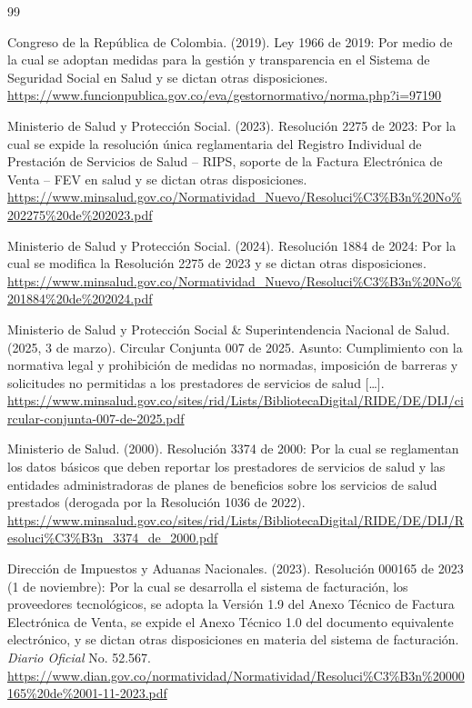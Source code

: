 \documentclass[12pt,letterpaper]{report}
\begin{document}
\begin{thebibliography}{99}


Congreso de la República de Colombia. (2019). Ley 1966 de 2019: Por medio de la cual se adoptan medidas para la gestión y transparencia en el Sistema de Seguridad Social en Salud y se dictan otras disposiciones. \url{https://www.funcionpublica.gov.co/eva/gestornormativo/norma.php?i=97190}

Ministerio de Salud y Protección Social. (2023). Resolución 2275 de 2023: Por la cual se expide la resolución única reglamentaria del Registro Individual de Prestación de Servicios de Salud -- RIPS, soporte de la Factura Electrónica de Venta -- FEV en salud y se dictan otras disposiciones. \url{https://www.minsalud.gov.co/Normatividad_Nuevo/Resoluci%C3%B3n%20No%202275%20de%202023.pdf}

Ministerio de Salud y Protección Social. (2024). Resolución 1884 de 2024: Por la cual se modifica la Resolución 2275 de 2023 y se dictan otras disposiciones. \url{https://www.minsalud.gov.co/Normatividad_Nuevo/Resoluci%C3%B3n%20No%201884%20de%202024.pdf}

Ministerio de Salud y Protección Social \& Superintendencia Nacional de Salud. (2025, 3 de marzo). Circular Conjunta 007 de 2025. Asunto: Cumplimiento con la normativa legal y prohibición de medidas no normadas, imposición de barreras y solicitudes no permitidas a los prestadores de servicios de salud [\ldots]. \url{https://www.minsalud.gov.co/sites/rid/Lists/BibliotecaDigital/RIDE/DE/DIJ/circular-conjunta-007-de-2025.pdf}

Ministerio de Salud. (2000). Resolución 3374 de 2000: Por la cual se reglamentan los datos básicos que deben reportar los prestadores de servicios de salud y las entidades administradoras de planes de beneficios sobre los servicios de salud prestados (derogada por la Resolución 1036 de 2022). \url{https://www.minsalud.gov.co/sites/rid/Lists/BibliotecaDigital/RIDE/DE/DIJ/Resoluci%C3%B3n_3374_de_2000.pdf}

Dirección de Impuestos y Aduanas Nacionales. (2023). Resolución 000165 de 2023 (1 de noviembre): Por la cual se desarrolla el sistema de facturación, los proveedores tecnológicos, se adopta la Versión 1.9 del Anexo Técnico de Factura Electrónica de Venta, se expide el Anexo Técnico 1.0 del documento equivalente electrónico, y se dictan otras disposiciones en materia del sistema de facturación. \textit{Diario Oficial} No. 52.567. \url{https://www.dian.gov.co/normatividad/Normatividad/Resoluci%C3%B3n%20000165%20de%2001-11-2023.pdf}


\end{thebibliography}
\end{document}
